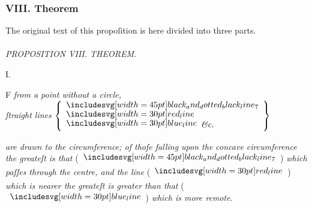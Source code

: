 \documentclass[11pt,preview]{standalone}
\begin{document}
\null\removelastskip\nointerlineskip\vspace*{-\baselineskip}

\subsubsection{VIII. Theorem}

\begin{minipage}[t]{0.43\textwidth}
    \vspace{55pt}
    
\end{minipage}%
\hfill
\begin{minipage}[t]{0.54\textwidth}
    \begin{center}
        The original text of this propoſition is here divided into three parts.\\
        \hfill\\
        \textit{PROPOSITION VIII. THEOREM.}\label{book3pr8}
    \end{center}

    \hfill

    \begin{center}
        I.\\
        \raggedright \lettrine[lines=3, loversize=1, nindent=0pt]{}{}F \textit{from a point without a circle,\\ ſtraight lines} $\left\{\begin{aligned}                                                               & \bimg{black_and_dotted_black_line_7} \\[-2ex] & \redline \\[-2ex] & \blueline \textit{\&c.}
            \end{aligned}\right\}$
    \end{center}
    \raggedright \textit{are drawn to the circumference; of thoſe falling upon the concave circumference the greateſt is that} (\hspace{-1ex}$\bimg{black_and_dotted_black_line_7}$\hspace{-1ex}) \textit{which paſſes through the centre, and the line} (\hspace{-1ex}$\redline$\hspace{-1ex}) \textit{which is nearer the greateſt is greater than  that} (\hspace{-1ex}$\blueline$\hspace{-1ex}) \textit{which is more remote}.
\end{minipage}%
\end{document}
